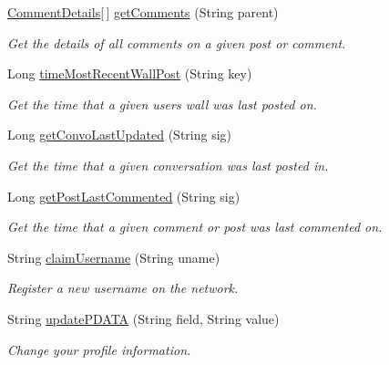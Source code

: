 \begin{DoxyCompactItemize}
\hyperlink{classballmerpeak_1_1turtlenet_1_1shared_1_1CommentDetails}{Comment\-Details}\mbox{[}$\,$\mbox{]} \hyperlink{classballmerpeak_1_1turtlenet_1_1server_1_1TurtlenetImpl_a8ce303e4ed5dd6b459c28595c4fe53a4}{get\-Comments} (String parent)
\begin{DoxyCompactList}\small\item\em Get the details of all comments on a given post or comment. \end{DoxyCompactList}\item 
Long \hyperlink{classballmerpeak_1_1turtlenet_1_1server_1_1TurtlenetImpl_a0555da815949426da19e4aa94798fb77}{time\-Most\-Recent\-Wall\-Post} (String key)
\begin{DoxyCompactList}\small\item\em Get the time that a given users wall was last posted on. \end{DoxyCompactList}\item 
Long \hyperlink{classballmerpeak_1_1turtlenet_1_1server_1_1TurtlenetImpl_a9215bd0cbe7b6c5e925867c7a8ab4be3}{get\-Convo\-Last\-Updated} (String sig)
\begin{DoxyCompactList}\small\item\em Get the time that a given conversation was last posted in. \end{DoxyCompactList}\item 
Long \hyperlink{classballmerpeak_1_1turtlenet_1_1server_1_1TurtlenetImpl_ac98d21dc081755ae7ec66220a0287551}{get\-Post\-Last\-Commented} (String sig)
\begin{DoxyCompactList}\small\item\em Get the time that a given comment or post was last commented on. \end{DoxyCompactList}\item 
String \hyperlink{classballmerpeak_1_1turtlenet_1_1server_1_1TurtlenetImpl_a614a4363b79719b16cc10d9871807326}{claim\-Username} (String uname)
\begin{DoxyCompactList}\small\item\em Register a new username on the network. \end{DoxyCompactList}\item 
String \hyperlink{classballmerpeak_1_1turtlenet_1_1server_1_1TurtlenetImpl_a6498adb8c069a9778b241dde8bad667a}{update\-P\-D\-A\-T\-A} (String field, String value)
\begin{DoxyCompactList}\small\item\em Change your profile information. \end{DoxyCompactList}\item 

\end{DoxyCompactItemize}
